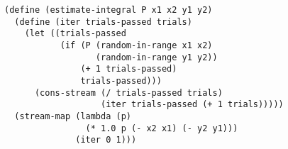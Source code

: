 \documentclass[a4paper,12pt]{article}
\begin{document}
\begin{lstlisting}
(define (estimate-integral P x1 x2 y1 y2)
  (define (iter trials-passed trials)
    (let ((trials-passed
           (if (P (random-in-range x1 x2)
                  (random-in-range y1 y2))
               (+ 1 trials-passed)
               trials-passed)))
      (cons-stream (/ trials-passed trials)
                   (iter trials-passed (+ 1 trials)))))
  (stream-map (lambda (p)
                (* 1.0 p (- x2 x1) (- y2 y1)))
              (iter 0 1)))
\end{lstlisting}
\end{document}
